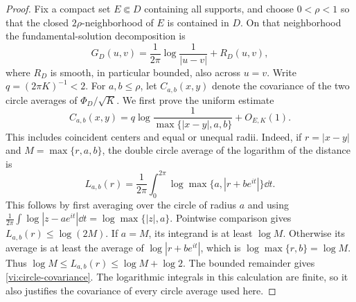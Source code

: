 \begin{proof}
Fix a compact set $E\Subset D$ containing all supports, and choose
$0<\rho<1$ so that the closed $2\rho$-neighborhood of $E$ is contained
in $D$.  On that neighborhood the fundamental-solution decomposition is
\[
 G_D(u,v)=\frac1{2\pi}\log\frac1{|u-v|}+R_D(u,v),
\]
where $R_D$ is smooth, in particular bounded, also across $u=v$.
Write $q=(2\pi K)^{-1}<2$.
For $a,b\leq\rho$, let $C_{a,b}(x,y)$ denote the covariance of the two
circle averages of $\Phi_D/\sqrt K$.
We first prove the uniform estimate
\begin{equation}\label{vi:circle-covariance}
 C_{a,b}(x,y)
 =q\log\frac1{\max\{|x-y|,a,b\}}+O_{E,K}(1).
\end{equation}
This includes coincident centers and equal or unequal radii.
Indeed, if $r=|x-y|$ and $M=\max\{r,a,b\}$, the double circle average
of the logarithm of the distance is
\[
 L_{a,b}(r)=\frac1{2\pi}\int_0^{2\pi}
                  \log\max\{a,|r+be^{it}|\}\dd t.
\]
This follows by first averaging over the circle of radius $a$ and using
$\frac1{2\pi}\int\log|z-ae^{it}|\dd t=\log\max\{|z|,a\}$.
Pointwise comparison gives $L_{a,b}(r)\leq\log(2M)$.
If $a=M$, its integrand is at least $\log M$.
Otherwise its average is at least the average of
$\log|r+be^{it}|$, which is $\log\max\{r,b\}=\log M$.
Thus $\log M\leq L_{a,b}(r)\leq\log M+\log2$.
The bounded remainder gives \eqref{vi:circle-covariance}.
The logarithmic integrals in this calculation are finite, so it also
justifies the covariance of every circle average used here.


\end{proof}
